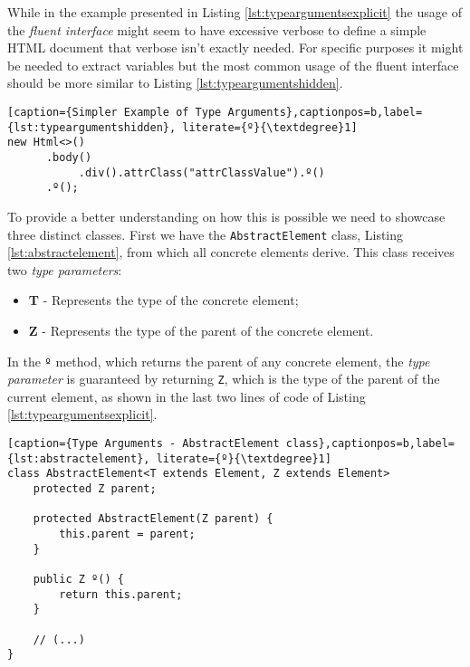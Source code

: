 \noindent
While in the example presented in Listing \ref{lst:typeargumentsexplicit} the usage of the \textit{fluent interface} might seem to have excessive verbose to define a simple \ac{HTML} document that verbose isn't exactly needed. For specific purposes it might be needed to extract variables but the most common usage of the fluent interface should be more similar to Listing \ref{lst:typeargumentshidden}.  

\bigskip


\begin{minipage}{\linewidth}
\begin{lstlisting}[caption={Simpler Example of Type Arguments},captionpos=b,label={lst:typeargumentshidden}, literate={º}{\textdegree}1]
new Html<>()
      .body()
           .div().attrClass("attrClassValue").º()
      .º();
\end{lstlisting}
\end{minipage}

\noindent
To provide a better understanding on how this is possible we need to showcase three distinct classes. First we have the \texttt{AbstractElement} class, Listing \ref{lst:abstractelement}, from which all concrete elements derive. This class receives two \textit{type parameters}: 

\begin{itemize}
	\item \textbf{T} - Represents the type of the concrete element; 
	\item \textbf{Z} - Represents the type of the parent of the concrete element.
\end{itemize}	


\noindent
In the \texttt{º} method, which returns the parent of any concrete element, the \textit{type parameter} is guaranteed by returning \texttt{Z}, which is the type of the parent of the current element, as shown in the last two lines of code of Listing \ref{lst:typeargumentsexplicit}.

\bigskip

\begin{minipage}{\linewidth}
\begin{lstlisting}[caption={Type Arguments - AbstractElement class},captionpos=b,label={lst:abstractelement}, literate={º}{\textdegree}1]
class AbstractElement<T extends Element, Z extends Element>
	protected Z parent;
	
    protected AbstractElement(Z parent) {
        this.parent = parent;
    }	
	
	public Z º() {
		return this.parent;
	}
	
	// (...)
}
\end{lstlisting}
\end{minipage}

